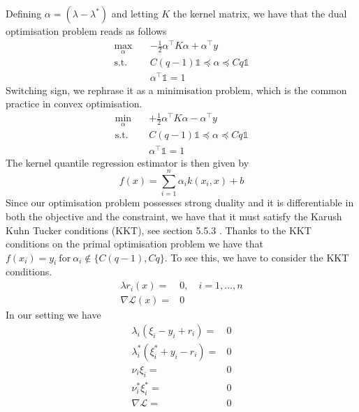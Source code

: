 Defining $\alpha=(\lambda-\lambda^*)$ and letting $K$ the kernel matrix, we have that the dual optimisation problem reads as follows
\begin{equation}\label{eq:kqr_min6}
    \begin{aligned}
        \max_{\alpha} \quad & -\frac{1}{2}\alpha^\intercal K\alpha+\alpha^\intercal y\\
    \textrm{s.t.} \quad & 
    C(q-1)\mathbb{1}\preceq \alpha \preceq Cq\mathbb{1}\\
    &\alpha^\intercal\mathbb{1}=1
    \end{aligned}
    \end{equation}
Switching sign, we rephrase it as a minimisation problem, which is the common practice in convex optimisation.
\begin{equation}\label{eq:kqr_min7}
    \begin{aligned}
        \min_{\alpha} \quad & +\frac{1}{2}\alpha^\intercal K \alpha-\alpha^\intercal y\\
    \textrm{s.t.} \quad & 
    C(q-1)\mathbb{1}\preceq \alpha \preceq Cq\mathbb{1}\\
    &\alpha^\intercal\mathbb{1}=1
    \end{aligned}
    \end{equation}
The kernel quantile regression estimator is then given by
\begin{equation}
    f(x)=\sum\limits_{i=1}^{n} \alpha_i k(x_i, x)+b
\end{equation}
Since our optimisation problem possesses strong duality and it is differentiable in both the objective and the constraint, we have that it must satisfy the Karush Kuhn Tucker conditions (KKT), see section 5.5.3 \cite{boyd2004convex}.
Thanks to the KKT conditions on the primal optimisation problem we have that $f(x_i)=y_i \ \mathrm{for} \ \alpha_i \not \in \{C(q-1), Cq\}$. 
To see this, we have to consider the KKT conditions.
\begin{equation}
    \begin{aligned}
    \lambda r_i(x)=&0, \quad i=1,\dots,n
    \\
    \nabla \mathcal{L}(x)=&0
\end{aligned}
\end{equation}
In our setting we have
\begin{equation}
    \begin{aligned}
        \lambda_i(\xi_i-y_i+r_i)=&0
        \\
        \lambda_i^*(\xi_i^*+y_i-r_i)=&0
        \\
        \nu_i \xi_i=&0
        \\
        \nu_i^* \xi_i^*=&0
        \\
        \nabla \mathcal{L} =&0
    \end{aligned}
\end{equation}
